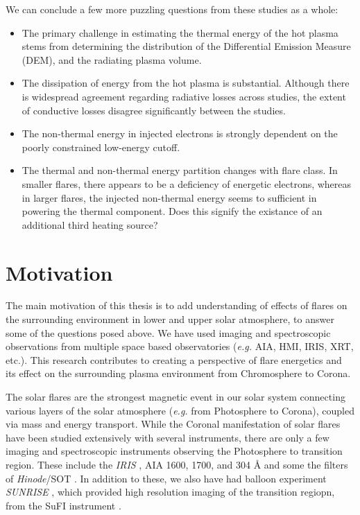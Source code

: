 We can conclude a few more puzzling questions from these studies as a whole:

\begin{itemize}
    \item The primary challenge in estimating the thermal energy of the hot plasma stems from determining the distribution of the Differential Emission Measure (DEM), and the radiating plasma volume.
    \item The dissipation of energy from the hot plasma is substantial. Although there is widespread agreement regarding radiative losses across studies, the extent of conductive losses disagree significantly between the studies.
    \item The non-thermal energy in injected electrons is strongly dependent on the poorly constrained low-energy cutoff.
    \item The thermal and non-thermal energy partition changes with flare class. In smaller flares, there appears to be a deficiency of energetic electrons, whereas in larger flares, the injected non-thermal energy seems to sufficient in powering the thermal component. Does this signify the existance of an additional third heating source?
\end{itemize}


\section{Motivation}\label{sec:mot}

The main motivation of this thesis is to add understanding of effects of flares on the surrounding environment in lower and upper solar atmosphere, to answer some of the questions posed above. We have used imaging and spectroscopic observations from multiple space based observatories ({\it e.g.} AIA, HMI, IRIS, XRT, etc.). This research contributes to creating a perspective of flare energetics and its effect on the surrounding plasma environment from Chromosphere to Corona.

The solar flares are the strongest magnetic event in our solar system connecting various layers of the solar atmosphere ({\it e.g.} from Photosphere to Corona), coupled via mass and energy transport. While the Coronal manifestation of solar flares have been studied extensively with several instruments, there are only a few imaging and spectroscopic instruments observing the Photosphere to transition region. These include the {\it IRIS} \citep{iris}, AIA 1600, 1700, and 304 {\AA} \citep{aia} and some the filters of {\it Hinode}/SOT \citep{sot}. In addition to these, we also have had balloon experiment {\it SUNRISE} \citep{sunrise1,sunrise2}, which provided high resolution imaging of the transition regiopn, from the SuFI instrument \citep{sufi}.

